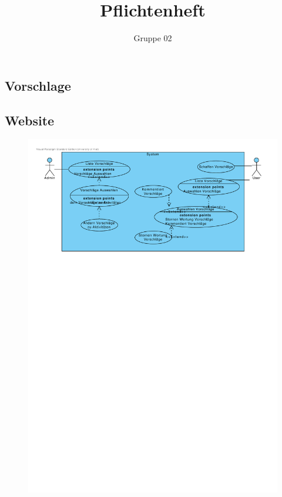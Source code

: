 \documentclass[10pt,a4paper]{article}
\author{Gruppe 02}
\title{Pflichtenheft}
\begin{document}
	\subsection{Vorschlage}
	\subsection{Website}
	\begin{figure}[h]
		\includegraphics[width=\linewidth]{gfx/webseite/vorschlage.pdf}
	\end{figure}
\end{document}
